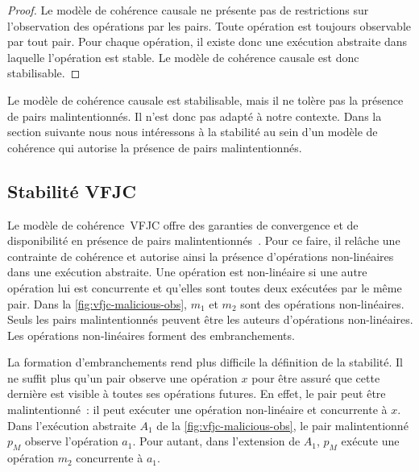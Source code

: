 \begin{proof}
Le modèle de cohérence causale ne présente pas de restrictions sur l'observation des opérations par les pairs.
Toute opération est toujours observable par tout pair.
Pour chaque opération, il existe donc une exécution abstraite dans laquelle l'opération est stable.
Le modèle de cohérence causale est donc stabilisable.
\end{proof}

Le modèle de cohérence causale est stabilisable, mais il ne tolère pas la présence de pairs malintentionnés.
Il n'est donc pas adapté à notre contexte.
Dans la section suivante nous nous intéressons à la stabilité au sein d'un modèle de cohérence qui autorise la présence de pairs malintentionnés.


\subsection{Stabilité \acl{VFJC}}\label{subsec:vfjcs}

Le modèle de cohérence~\acf{VFJC} offre des garanties de convergence et de disponibilité en présence de pairs malintentionnés~\autocite{mahajan_2011_cac}.
Pour ce faire, il relâche une contrainte de cohérence et autorise ainsi la présence d'opérations non-linéaires dans une exécution abstraite.
Une opération est non-linéaire si une autre opération lui est concurrente et qu'elles sont toutes deux exécutées par le même pair.
Dans la \autoref{fig:vfjc-malicious-obs}, $m_1$ et $m_2$ sont des opérations non-linéaires.
Seuls les pairs malintentionnés peuvent être les auteurs d'opérations non-linéaires.
Les opérations non-linéaires forment des embranchements.

La formation d'embranchements rend plus difficile la définition de la stabilité.
Il ne suffit plus qu'un pair observe une opération $x$ pour être assuré que cette dernière est visible à toutes ses opérations futures.
En effet, le pair peut être malintentionné~: il peut exécuter une opération non-linéaire et concurrente à $x$.
Dans l'exécution abstraite $A_1$ de la \autoref{fig:vfjc-malicious-obs}, le pair malintentionné $p_M$ observe l'opération $a_1$.
Pour autant, dans l'extension de $A_1$, $p_M$ exécute une opération $m_2$ concurrente à $a_1$.

